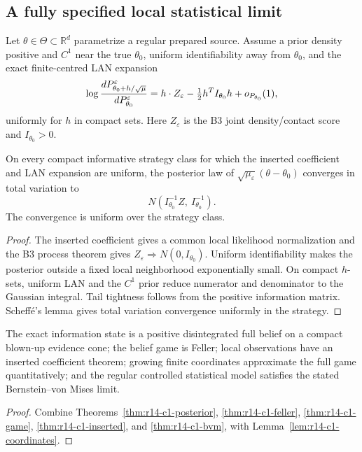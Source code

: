 \subsection{A fully specified local statistical limit}

Let \(\theta\in\Theta\subset\mathbb R^d\) parametrize a regular prepared
source.  Assume a prior density positive and \(C^1\) near the true
\(\theta_0\), uniform identifiability away from \(\theta_0\), and the exact
finite-centred LAN expansion
\[
 \log{dP_{\theta_0+h/\sqrt\mu}^\varepsilon
          \over dP_{\theta_0}^\varepsilon}
 =
 h\cdot Z_\varepsilon
 -\tfrac12h^TI_{\theta_0}h+o_{P_{\theta_0}}(1),
\]
uniformly for \(h\) in compact sets.  Here \(Z_\varepsilon\) is the B3 joint
density/contact score and \(I_{\theta_0}>0\).

\begin{theorem}
\label{thm:r14-c1-bvm}
On every compact informative strategy class for which the inserted
coefficient and LAN expansion are uniform, the posterior law of
\(\sqrt{\mu_\varepsilon}(\theta-\theta_0)\) converges in total variation to
\[
 N\!\left(I_{\theta_0}^{-1}Z,\ I_{\theta_0}^{-1}\right).
\]
The convergence is uniform over the strategy class.
\end{theorem}

\begin{proof}
The inserted coefficient gives a common local likelihood normalization and
the B3 process theorem gives \(Z_\varepsilon\Rightarrow
N(0,I_{\theta_0})\).  Uniform identifiability makes the posterior outside a
fixed local neighborhood exponentially small.  On compact \(h\)-sets,
uniform LAN and the \(C^1\) prior reduce numerator and denominator to the
Gaussian integral.  Tail tightness follows from the positive information
matrix.  Scheff\'e's lemma gives total variation convergence uniformly in the
strategy.
\end{proof}

\begin{theorem}
\label{thm:r14-c1-main}
The exact information state is a positive disintegrated full belief on a
compact blown-up evidence cone; the belief game is Feller; local observations
have an inserted coefficient theorem; growing finite coordinates approximate
the full game quantitatively; and the regular controlled statistical model
satisfies the stated Bernstein--von Mises limit.
\end{theorem}

\begin{proof}
Combine Theorems~\ref{thm:r14-c1-posterior},
\ref{thm:r14-c1-feller}, \ref{thm:r14-c1-game},
\ref{thm:r14-c1-inserted}, and \ref{thm:r14-c1-bvm}, with
Lemma~\ref{lem:r14-c1-coordinates}.
\end{proof}
